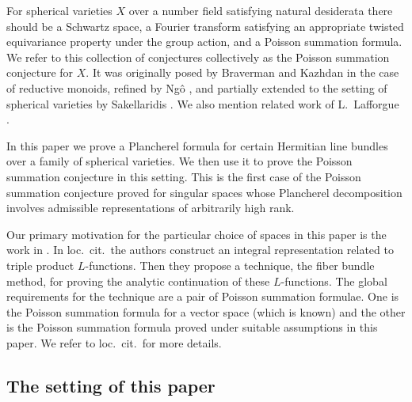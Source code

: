 \documentclass[12pt]{amsart}
\theoremstyle{remark}
\numberwithin{equation}{section}
\theoremstyle{definition}
\numberwithin{equation}{subsection}
\begin{document}
For  spherical varieties $X$ over a number field satisfying natural desiderata there should be a Schwartz space, a Fourier transform satisfying an appropriate twisted equivariance property under the group action, and a Poisson summation formula.   We refer to this collection of conjectures collectively as the Poisson summation conjecture for $X.$  It was originally posed 
by Braverman and Kazhdan \cite{BK-lifting,BK:normalized} in the case of reductive monoids, refined by Ng\^o \cite{NgoSums,Ngo:Hankel}, and partially extended to the setting of spherical varieties by Sakellaridis \cite{SakellaridisSph}.  We also mention related work of L.~Lafforgue  \cite{LafforgueJJM}.   

In this paper we prove a Plancherel formula for certain Hermitian line bundles over a family of spherical varieties.
 We then use it to prove the Poisson summation conjecture in this setting.  
 This is the first case of the Poisson summation conjecture proved for singular spaces whose Plancherel decomposition involves admissible representations of arbitrarily high rank. 

Our primary motivation for the particular choice of spaces in this paper is the work in 
\cite{GGHL}.  In loc.~cit.~the authors construct an integral representation related to triple product $L$-functions.  Then they propose a technique, the fiber bundle method, for proving the analytic continuation of these $L$-functions.  The global requirements for the technique are a pair of Poisson summation formulae.  One is the Poisson summation formula for a vector space (which is known) and the other is the Poisson summation formula proved under suitable assumptions in this paper.  We refer
 to loc.~cit.~for more details.

\subsection{The setting of this paper}
\end{document}
